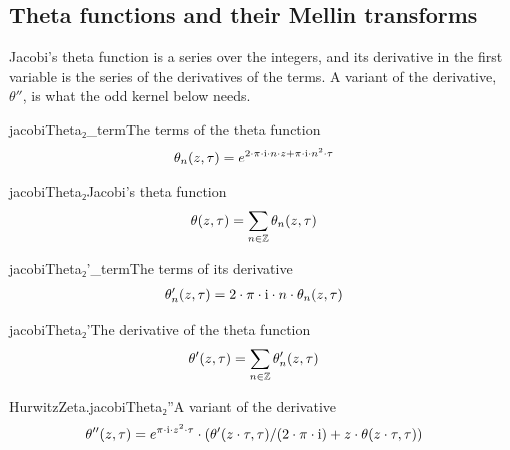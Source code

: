 \documentclass{article}
\begin{document}
\subsection{Theta functions and their Mellin transforms}

Jacobi's theta function is a series over the integers, and its derivative
in the first variable is the series of the derivatives of the terms. A
variant of the derivative, $\theta''$, is what the odd kernel below needs.

\begin{leandefinition}[def, sum=D0gbudZeiV]{jacobiTheta₂_term}{The terms of the theta function}
\label{def:jacobiThetau2082_term}
\[\LeanMath{\begin{aligned}\theta_{n}(z, \tau) &= e^{2 \cdot \pi \cdot \mathrm{i} \cdot n \cdot z + \pi \cdot \mathrm{i} \cdot n^{2} \cdot \tau}\end{aligned}}\]
\end{leandefinition}

\begin{leandefinition}[def, sum=_WsAhWf3wb]{jacobiTheta₂}{Jacobi's theta function}
\label{def:jacobiThetau2082}
\[\LeanMath{\begin{aligned}\theta(z, \tau) &= \sum_{n \in \mathbb{Z}} \theta_{n}(z, \tau)\end{aligned}}\]
\end{leandefinition}

\begin{leandefinition}[def, sum=H022_QD8DO]{jacobiTheta₂'_term}{The terms of its derivative}
\label{def:jacobiThetau2082'_term}
\[\LeanMath{\begin{aligned}\theta'_{n}(z, \tau) &= 2 \cdot \pi \cdot \mathrm{i} \cdot n \cdot \theta_{n}(z, \tau)\end{aligned}}\]
\end{leandefinition}

\begin{leandefinition}[def, sum=CeW0wOFEex]{jacobiTheta₂'}{The derivative of the theta function}
\label{def:jacobiThetau2082'}
\[\LeanMath{\begin{aligned}\theta'(z, \tau) &= \sum_{n \in \mathbb{Z}} \theta'_{n}(z, \tau)\end{aligned}}\]
\end{leandefinition}

\begin{leandefinition}[def, sum=NIBqDF-DYM]{HurwitzZeta.jacobiTheta₂''}{A variant of the derivative}
\label{def:HurwitzZeta.jacobiThetau2082''}
\[\LeanMath{\begin{aligned}\theta''(z, \tau) &= e^{\pi \cdot \mathrm{i} \cdot z^{2} \cdot \tau} \cdot (\theta'(z \cdot \tau, \tau) / (2 \cdot \pi \cdot \mathrm{i}) + z \cdot \theta(z \cdot \tau, \tau))\end{aligned}}\]
\end{leandefinition}
\end{document}
